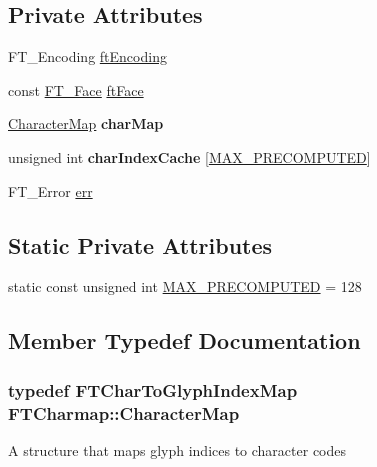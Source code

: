 \subsection*{Private Attributes}
\begin{DoxyCompactItemize}
\item 
F\+T\+\_\+\+Encoding \hyperlink{class_f_t_charmap_ae8f674fb3bf3c47f195be0a4bda2a37c}{ft\+Encoding}
\item 
const \hyperlink{struct_f_t___face_rec__}{F\+T\+\_\+\+Face} \hyperlink{class_f_t_charmap_ae377955e1d9bcc004572a7cd0a844dbf}{ft\+Face}
\item 
\hyperlink{class_f_t_charmap_a2dfb7dabf22eb8913cb4614348f5dbe8}{Character\+Map} {\bfseries char\+Map}\hypertarget{class_f_t_charmap_a028773245db04be6c09bd5998628c05f}{}\label{class_f_t_charmap_a028773245db04be6c09bd5998628c05f}

\item 
unsigned int {\bfseries char\+Index\+Cache} \mbox{[}\hyperlink{class_f_t_charmap_a243b0c471388cc02b3d1ebbd88212e7e}{M\+A\+X\+\_\+\+P\+R\+E\+C\+O\+M\+P\+U\+T\+ED}\mbox{]}\hypertarget{class_f_t_charmap_a5dbd7c2e797dd9d61d5c8c704f1626b0}{}\label{class_f_t_charmap_a5dbd7c2e797dd9d61d5c8c704f1626b0}

\item 
F\+T\+\_\+\+Error \hyperlink{class_f_t_charmap_a40ab36e2977087682c1a71f70a42965c}{err}
\end{DoxyCompactItemize}
\subsection*{Static Private Attributes}
\begin{DoxyCompactItemize}
\item 
static const unsigned int \hyperlink{class_f_t_charmap_a243b0c471388cc02b3d1ebbd88212e7e}{M\+A\+X\+\_\+\+P\+R\+E\+C\+O\+M\+P\+U\+T\+ED} = 128
\end{DoxyCompactItemize}


\subsection{Member Typedef Documentation}
\subsubsection[{\texorpdfstring{Character\+Map}{CharacterMap}}]{\setlength{\rightskip}{0pt plus 5cm}typedef {\bf F\+T\+Char\+To\+Glyph\+Index\+Map} {\bf F\+T\+Charmap\+::\+Character\+Map}\hspace{0.3cm}{\ttfamily [private]}}\hypertarget{class_f_t_charmap_a2dfb7dabf22eb8913cb4614348f5dbe8}{}\label{class_f_t_charmap_a2dfb7dabf22eb8913cb4614348f5dbe8}
A structure that maps glyph indices to character codes

